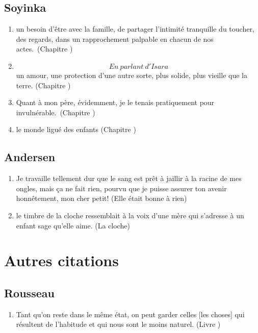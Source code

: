 \documentclass[a4paper, 11pt, hidelinks]{article}
\newcommand{\rb}[1]{\Romanbar{#1}}
\begin{document}
\subsection{Soyinka}


\begin{enumerate}
    \item un besoin d'être avec la famille, de partager l'intimité tranquille du toucher, des regards, dans un rapprochement palpable en chacun de nos actes. (Chapitre \rb{11})
    \item \[ En \ parlant \ d'Isara \] un amour, une protection d'une autre sorte, plus solide, plus vieille que la terre. (Chapitre \rb{5})
    \item Quant à mon père, évidemment, je le tenais pratiquement pour invulnérable. (Chapitre \rb{1})
    \item le monde ligué des enfants (Chapitre \rb{8})
\end{enumerate}




\subsection{Andersen}


\begin{enumerate}
    \item Je travaille tellement dur que le sang est prêt à jaillir à la racine de mes ongles, mais ça ne fait rien, pourvu que je puisse assurer ton avenir honnêtement, mon cher petit! (Elle était bonne à rien)
    \item le timbre de la cloche ressemblait à la voix d'une mère qui s'adresse à un enfant sage qu'elle aime. (La cloche)
\end{enumerate}







\section{Autres citations}





\subsection{Rousseau}


\begin{enumerate}
    \item Tant qu'on reste dans le même état, on peut garder celles [les choses] qui résultent de l'habitude et qui nous sont le moins naturel. (Livre \rb{1})
\end{enumerate}
\end{document}
